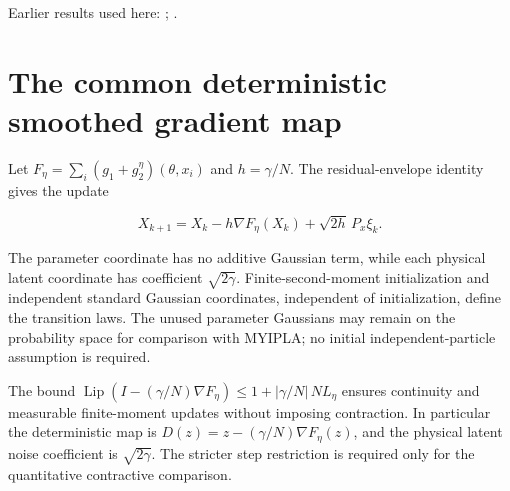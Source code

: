 \documentclass[11pt,a4paper]{article}
\begin{document}
Earlier results used here: \cite[Section~3.20.1]{LangevinLean2026ULASC}; \cite[Section~3.1.1]{LangevinLean2026IPLA}.

\section{\texorpdfstring{The common deterministic smoothed gradient map}{The common deterministic smoothed gradient map}}


Let \(F_\eta=\sum_i(g_1+g_2^\eta)(\theta,x_i)\) and \(h=\gamma/N\). The residual-envelope identity gives the update

\[
X_{k+1}=X_k-h\nabla F_\eta(X_k)+\sqrt{2h}\,P_x\xi_k.
\]

The parameter coordinate has no additive Gaussian term, while each physical latent coordinate has coefficient \(\sqrt{2\gamma}\). Finite-second-moment initialization and independent standard Gaussian coordinates, independent of initialization, define the transition laws. The unused parameter Gaussians may remain on the probability space for comparison with MYIPLA; no initial independent-particle assumption is required.



The bound \(\operatorname{Lip}(I-(\gamma/N)\nabla F_\eta)\le1+|\gamma/N|\,NL_\eta\) ensures continuity and measurable finite-moment updates without imposing contraction. In particular the deterministic map is \(D(z)=z-(\gamma/N)\nabla F_\eta(z)\), and the physical latent noise coefficient is \(\sqrt{2\gamma}\). The stricter step restriction is required only for the quantitative contractive comparison.
\end{document}
